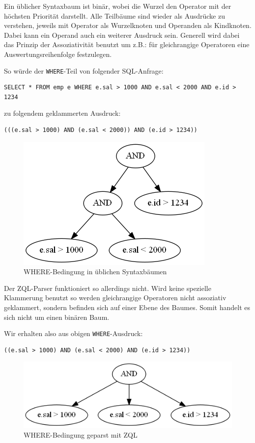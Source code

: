 Ein üblicher Syntaxbaum ist binär, wobei die Wurzel den Operator mit der höchsten Priorität darstellt. Alle Teilbäume sind wieder als Ausdrücke zu verstehen, jeweils mit Operator als Wurzelknoten und Operanden als Kindknoten. Dabei kann ein Operand auch ein weiterer Ausdruck sein. Generell wird dabei das Prinzip der Assoziativität benutzt um z.B.: für gleichrangige Operatoren eine Auswertungsreihenfolge festzulegen.

So würde der \verb|WHERE|-Teil von folgender SQL-Anfrage:
\begin{verbatim}
SELECT * FROM emp e WHERE e.sal > 1000 AND e.sal < 2000 AND e.id > 1234
\end{verbatim}

zu folgendem geklammerten Ausdruck:
\begin{verbatim}
(((e.sal > 1000) AND (e.sal < 2000)) AND (e.id > 1234))
\end{verbatim}

\begin{figure}[h]
\label{baum1}
\includegraphics[scale=0.7]{Bilder/where_syntax.png}
\caption{WHERE-Bedingung in üblichen Syntaxbäumen}
\end{figure}

Der ZQL-Parser funktioniert so allerdings nicht. Wird keine spezielle Klammerung benutzt so werden gleichrangige Operatoren nicht assoziativ geklammert, sondern befinden sich auf einer Ebene des Baumes. Somit handelt es sich nicht um einen binären Baum. 

Wir erhalten also aus obigen \verb|WHERE|-Ausdruck:
\begin{verbatim}
((e.sal > 1000) AND (e.sal < 2000) AND (e.id > 1234))
\end{verbatim}

\begin{figure}
\includegraphics[scale=0.7]{Bilder/with_zql.png}
\caption{WHERE-Bedingung geparst mit ZQL}
\end{figure}

